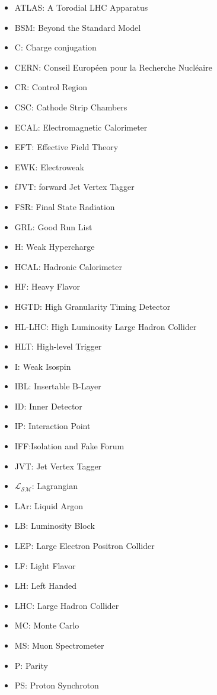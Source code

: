 \begin{itemize}
\item{ATLAS: A Torodial LHC Apparatus}
\item{BSM: Beyond the Standard Model}
\item{C: Charge conjugation}
\item{CERN: Conseil Europ\'{e}en pour la Recherche Nucl\'{e}aire}
\item{CR: Control Region}
\item{CSC: Cathode Strip Chambers } 
\item{ECAL: Electromagnetic Calorimeter} 
\item{EFT: Effective Field Theory}
\item{EWK: Electroweak}
\item{fJVT: forward Jet Vertex Tagger} 
\item{FSR: Final State Radiation}
\item{GRL: Good Run List}
\item{H: Weak Hypercharge}
\item{HCAL: Hadronic Calorimeter}
\item{HF: Heavy Flavor}
\item{HGTD: High Granularity Timing Detector} 
\item{HL-LHC: High Luminosity Large Hadron Collider}  
\item{HLT: High-level Trigger} 
\item{I: Weak Isospin}
\item{IBL: Insertable B-Layer} 
\item{ID: Inner Detector} 
\item{IP: Interaction Point}
\item{IFF:Isolation and Fake Forum}
\item{JVT: Jet Vertex Tagger} 
\item{$\mathcal{L_{SM}}$: Lagrangian}
\item{LAr: Liquid Argon} 
\item{LB: Luminosity Block}
\item{LEP: Large Electron Positron Collider} 
\item{LF: Light Flavor} 
\item{LH:  Left Handed}
\item{LHC: Large Hadron Collider}
\item{MC: Monte Carlo}
\item{MS: Muon Spectrometer}
\item{P: Parity}
\item{PS: Proton Synchroton}

\end{itemize}
